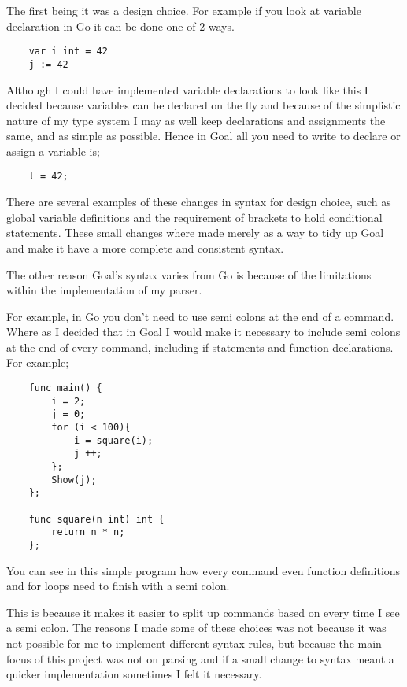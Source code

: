 The first being it was a design choice. For example if you look at variable declaration in Go it can be done one of 2 ways.

\begin{lstlisting}
	var i int = 42
	j := 42
\end{lstlisting}    

Although I could have implemented variable declarations to look like this I decided because variables can be declared on the fly and because of the simplistic nature of my type system I may as well keep declarations and assignments the same, and as simple as possible. Hence in Goal all you need to write to declare or assign a variable is;

\begin{lstlisting}
	l = 42;
\end{lstlisting}
 
There are several examples of these changes in syntax for design choice, such as global variable definitions and the requirement of brackets to hold conditional statements. These small changes where made merely as a way to tidy up Goal and make it have a more complete and consistent syntax. 

The other reason Goal's syntax varies from Go is because of the limitations within the implementation of my parser. 

For example, in Go you don't need to use semi colons at the end of a command. Where as I decided that in Goal I would make it necessary to include semi colons at the end of every command, including if statements and function declarations. For example;

\begin{lstlisting}
	func main() {
	    i = 2;
	    j = 0;
	    for (i < 100){
	        i = square(i);
	        j ++;
	    };
	    Show(j);		
	};
	
	func square(n int) int {
		return n * n;
	};
\end{lstlisting}

You can see in this simple program how every command even function definitions and for loops need to finish with a semi colon.

This is because it makes it easier to split up commands based on every time I see a semi colon. The reasons I made some of these choices was not because it was not possible for me to implement different syntax rules, but because the main focus of this project was not on parsing and if a small change to syntax meant a quicker implementation sometimes I felt it necessary. 


